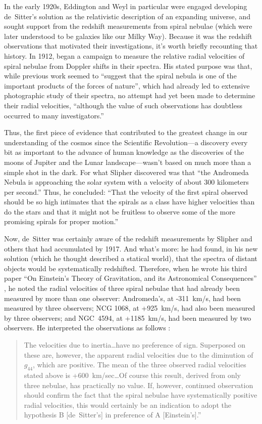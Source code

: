 \documentclass[12 pt]{article}
\begin{document}
In the early 1920s, Eddington and Weyl in particular were engaged developing de~Sitter's solution as the relativistic description of an expanding universe, and sought support from the redshift measurements from spiral nebulae (which were later understood to be galaxies like our Milky Way). Because it was the redshift observations that motivated their investigations, it's worth briefly recounting that history. In 1912, \citet{Slipher1913} began a campaign to measure the relative radial velocities of spiral nebulae from Doppler shifts in their spectra. His stated purpose was that, while previous work seemed to ``suggest that the spiral nebula is one of the important products of the forces of nature'', which had already led to extensive photographic study of their spectra, no attempt had yet been made to determine their radial velocities, ``although the value of such observations has doubtless occurred to many investigators.'' 

Thus, the first piece of evidence that contributed to the greatest change in our understanding of the cosmos since the Scientific Revolution---a discovery every bit as important to the advance of human knowledge as the discoveries of the moons of Jupiter and the Lunar landscape---wasn't based on much more than a simple shot in the dark. For what Slipher discovered was that ``the Andromeda Nebula is approaching the solar system with a velocity of about 300 kilometers per second.'' Thus, he concluded: ``That the velocity of the first spiral observed should be so high intimates that the spirals as a class have higher velocities than do the stars and that it might not be fruitless to observe some of the more promising spirals for proper motion.''

Now, de~Sitter was certainly aware of the redshift measurements by Slipher and others that had accumulated by 1917. And what's more: he had found, in his new solution (which he thought described a statical world), that the spectra of distant objects would be systematically redshifted. Therefore, when he wrote his third paper ``On Einstein's Theory of Gravitation, and its Astronomical Consequences'' \citep{deSitter1917b}, he noted the radial velocities of three spiral nebulae that had already been measured by more than one observer: Andromeda's, at -311~km/s, had been measured by three observers; NCG 1068, at +925~km/s, had also been measured by three observers; and NGC~4594, at +1185~km/s, had been measured by two observers. He interpreted the observations as follows \citep{deSitter1917b}: 
\begin{quote}
The velocities due to inertia\ldots have no preference of sign. Superposed on these are, however, the apparent radial velocities due to the diminution of $g_{44}$, which are positive. The mean of the three observed radial velocities stated above is +600~km/sec\ldots Of course this result, derived from only three nebulae, has practically no value. If, however, continued observation should confirm the fact that the spiral nebulae have systematically positive radial velocities, this would certainly be an indication to adopt the hypothesis B [de~Sitter's] in preference of A [Einstein's].''
\end{quote}
\end{document}
